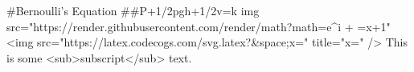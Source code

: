  #Bernoulli's Equation
 ##P+1/2pgh+1/2v=k
img src="https://render.githubusercontent.com/render/math?math=e^{i +\pi} =x+1"
<img src="https://latex.codecogs.com/svg.latex?\Large&space;x=" title="\Large x=" />
This is some <sub>subscript</sub> text.

